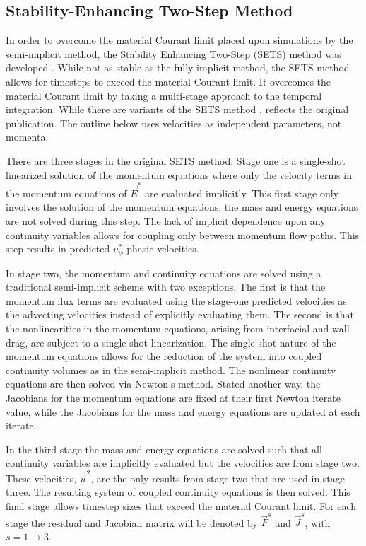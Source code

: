 \subsection{Stability-Enhancing Two-Step Method} 
\label{subsect:numerics_sets}
In order to overcome the material Courant limit placed upon simulations by the semi-implicit method, the Stability Enhancing Two-Step (SETS) method was developed \cite{Mahaffy1982}.
While not as stable as the fully implicit method, the SETS method allows for timesteps to exceed the material Courant limit.
It overcomes the material Courant limit by taking a multi-stage approach to the temporal integration.
While there are variants of the SETS method \cite{TRACE},  reflects the original publication.
The outline below uses velocities as independent parameters, not momenta.

There are three stages in the original SETS method.
Stage one is a single-shot linearized solution of the momentum equations where only the velocity terms in the momentum equations of $\vec{E}^{*}$ are evaluated implicitly.
This first stage only involves the solution of the momentum equations; the mass and energy equations are not solved during this step.
The lack of implicit dependence upon any continuity variables allows for coupling only between momentum flow paths.
This step results in predicted $u^{*}_{\phi}$ phasic velocities.

In stage two, the momentum and continuity equations are solved using a traditional semi-implicit scheme with two exceptions.
The first is that the momentum flux terms are evaluated using the stage-one predicted velocities as the advecting velocities instead of explicitly evaluating them.
The second is that the nonlinearities in the momentum equations, arising from interfacial and wall drag, are subject to a single-shot linearization.
The single-shot nature of the momentum equations allows for the reduction of the system into coupled continuity volumes as in the semi-implicit method.
The nonlinear continuity equations are then solved via Newton's method.
Stated another way, the Jacobians for the momentum equations are fixed at their first Newton iterate value, while the Jacobians for the mass and energy equations are updated at each iterate.

In the third stage the mass and energy equations are solved such that all continuity variables are implicitly evaluated but the velocities are from stage two.
These velocities, $\vec{u}^{2}$, are the only results from stage two that are used in stage three. 
The resulting system of coupled continuity equations is then solved.
This final stage allows timestep sizes that exceed the material Courant limit.
For each stage the residual and Jacobian matrix will be denoted by $\vec{F}^{s}$ and $\vec{J}^{s}$, with $s = 1 \to 3$.

